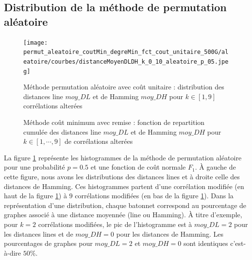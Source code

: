 \documentclass[onecolumn, 12pt]{book}
\begin{document}
\subsection{Distribution de la m\'ethode de permutation al\'eatoire}
\begin{centering} 
\begin{figure}[htb!] 
\texttt{[image: permut\_aleatoire\_coutMin\_degreMin\_fct\_cout\_unitaire\_500G/aleatoire/courbes/distanceMoyenDLDH\_k\_0\_10\_aleatoire\_p\_05.jpeg]}
\caption{ M\'ethode permutation al\'eatoire avec co\^ut unitaire : distribution des distances line $moy\_DL$ et de Hamming $moy\_DH$ pour $k \in [1,  9]$ corr\'elations alter\'ees}
\label{distLineHammingPermutAleatoireK09p05} 
\end{figure}
\end{centering} 
\begin{centering} 
\begin{figure}[htb!] 
\caption{ M\'ethode co\^ut minimum avec remise : fonction de repartition cumul\'ee des distances line $moy\_DL$ et de Hamming $moy\_DH$ pour $k \in [1, \cdots, 9]$ de corr\'elations alter\'ees}
\label{fctRepartitionCumuleDistLineHammingPermutAleatoireK09p05} 
\end{figure}
\end{centering} 
La figure \ref{distLineHammingPermutAleatoireK09p05} repr\'esente les histogrammes de la m\'ethode de permutation al\'eatoire pour une probabilit\'e $p=0.5$ et une fonction de co\^ut normale $F_1$. \`A gauche de cette figure, nous avons les distributions des distances lines et \`a droite celle des distances de Hamming. Ces histogrammes partent d'une corr\'elation modifi\'ee (en haut de la figure \ref{distLineHammingPermutAleatoireK09p05}) \`a $9$ corr\'elations  modifi\'ees (en bas de la figure \ref{distLineHammingPermutAleatoireK09p05}). 
\newline
Dans la repr\'esentation d'une distribution, chaque batonnet correspond au pourcentage de graphes associ\'e \`a une distance moyenn\'ee (line ou Hamming).
\`A titre d'exemple, pour $k=2$ corr\'elations modifi\'ees, le pic de l'histogramme est \`a $moy\_DL = 2$ pour les distances lines et de $moy\_DH=0$ pour les distances de Hamming. 
Les pourcentages de graphes pour  $moy\_DL = 2$ et $moy\_DH=0$ sont identiques c'est-\`a-dire $50\%$. 
\end{document}
